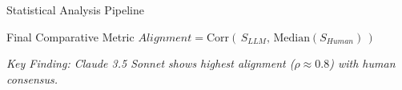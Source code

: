 \begin{frame}{Statistical Analysis Pipeline}
{
    }

    \vspace{0.8cm}

    \begin{block}{Final Comparative Metric}
        \centering
        \large
        $Alignment = \text{Corr}(\, S_{LLM}, \, \text{Median}(S_{Human}) \,)$
    \end{block}

    \vspace{0.2cm}
    \footnotesize \textit{Key Finding: Claude 3.5 Sonnet shows highest alignment ($\rho \approx 0.8$) with human consensus.}
\end{frame}